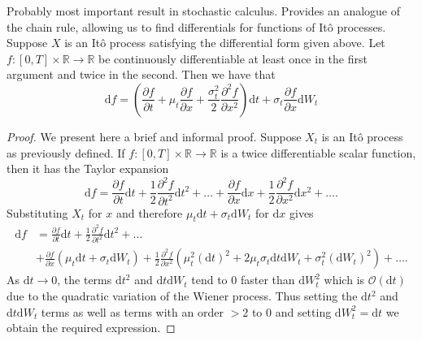 \begin{lemma}[It\^{o}'s Lemma]
    Probably most important result in stochastic calculus. Provides an analogue of the chain rule,
    allowing us to find differentials for functions of It\^{o} processes. Suppose $X$ is an It\^{o}
    process satisfying the differential form given above. Let $f:[0,T]\times\mathbb{R}\rightarrow\mathbb{R}$
    be continuously differentiable at least once in the first argument and twice in the second.
    Then we have that
    \begin{equation}
        \mathrm df=\left(\frac{\partial f}{\partial t}+\mu_t\frac{\partial f}{\partial x}+\frac{\sigma_t^2}{2}\frac{\partial^2 f}{\partial x^2}\right)\mathrm dt + \sigma_t\frac{\partial f}{\partial x}\mathrm dW_t
    \end{equation}
\end{lemma}
\begin{proof}
    We present here a brief and informal proof. Suppose $X_t$ is an It\^{o} process
    as previously defined. If $f:[0,T]\times\mathbb{R}\rightarrow\mathbb{R}$ is a 
    twice differentiable scalar function, then it has the Taylor expansion
    \begin{equation}
        \mathrm df = \frac{\partial f}{\partial t}\mathrm dt+\frac{1}{2}\frac{\partial^2f}{\partial t^2}\mathrm dt^2+\dots+\frac{\partial f}{\partial x}\mathrm dx+\frac{1}{2}\frac{\partial^2f}{\partial x^2}\mathrm dx^2+\dots.
    \end{equation}
    Substituting $X_t$ for $x$ and therefore $\mu_t\mathrm dt + \sigma_t\mathrm dW_t$
    for $\mathrm dx$ gives
    \begin{align*}
        \mathrm df &= \frac{\partial f}{\partial t}\mathrm dt+\frac{1}{2}\frac{\partial^2f}{\partial t^2}\mathrm dt^2+\dots\\
        &+\frac{\partial f}{\partial x}(\mu_t\mathrm dt + \sigma_t\mathrm dW_t)+\frac{1}{2}\frac{\partial^2f}{\partial x^2}(\mu_t^2(\mathrm dt)^2 + 2\mu_t\sigma_t\mathrm dt\mathrm dW_t+ \sigma_t^2(\mathrm dW_t)^2)+\dots.
    \end{align*}
    As $\mathrm dt\rightarrow0$, the terms $\mathrm dt^2$ and $\mathrm dt\mathrm dW_t$ 
    tend to 0 faster than $\mathrm dW_t^2$ which is $\mathcal{O}(\mathrm dt)$ due to
    the quadratic variation of the Wiener process. Thus setting the $\mathrm dt^2$ 
    and $\mathrm dt\mathrm dW_t$ terms as well as terms with an order $>2$ to 0
    and setting $\mathrm dW_t^2=\mathrm dt$ we obtain the required expression.
\end{proof}

